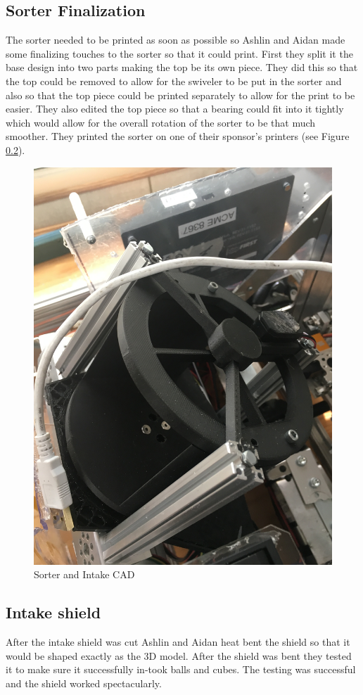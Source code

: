 \documentclass{article}
\newif\ifcontents
\begin{document}
\contentsfalse

 
\subsection{Sorter Finalization}
The sorter needed to be printed as soon as possible so Ashlin and Aidan made some finalizing touches to the sorter so that it could print. First they split it the base design into two parts making the top be its own piece. They did this so that the top could be removed to allow for the swiveler to be put in the sorter and also so that the top piece could be printed separately to allow for the print to be easier. They also edited the top piece so that a bearing could fit into it tightly which would allow for the overall rotation of the sorter to be that much smoother. They printed the sorter on one of their sponsor's printers (see Figure \ref{}).

\begin{figure}
    \centering
    \includegraphics[width=.6 \textwidth, angle=270 ]{10_11-05/images/sorter.JPG}
    \caption{Sorter and Intake CAD}
    \label{fig:Intake CAD}
\end{figure}

\subsection{Intake shield}
After the intake shield was cut Ashlin and Aidan heat bent the shield so that it would be shaped exactly as the 3D model. After the shield was bent they tested it to make sure it successfully in-took balls and cubes. The testing was successful and the shield worked  spectacularly.
\end{document}
